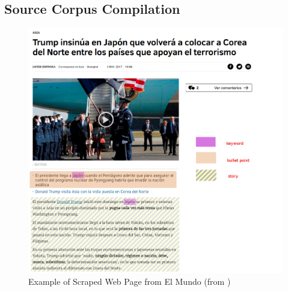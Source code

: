 \documentclass[]{article}
\begin{document}
\subsection{Source Corpus Compilation}
\begin{center}
	\begin{figure}
		\includegraphics[width=\linewidth]{media/article.png}
		\caption{Example of Scraped Web Page from El Mundo (from \cite{elmundosample})}
		\label{fig:article}
	\end{figure}
\end{center}
\end{document}

